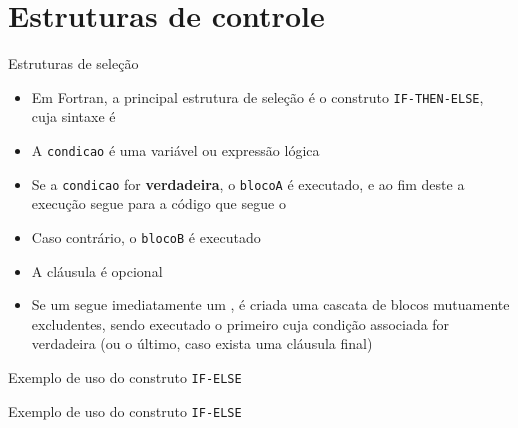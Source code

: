 \section{Estruturas de controle}

\begin{frame}[fragile]{Estruturas de seleção}

    \begin{itemize}
        \item Em Fortran, a principal estrutura de seleção é o construto \texttt{IF-THEN-ELSE},
            cuja sintaxe é


        \item A \texttt{condicao} é uma variável ou expressão lógica

        \item Se a \texttt{condicao} for \textbf{verdadeira}, o \texttt{blocoA} é executado, e ao
            fim deste a execução segue para a código que segue o 

        \item Caso contrário, o \texttt{blocoB} é executado

        \item A cláusula  é opcional

        \item Se um  segue imediatamente um , é criada
            uma cascata de blocos mutuamente excludentes, sendo executado o primeiro cuja
            condição associada for verdadeira (ou o último, caso exista uma cláusula 
             final)

    \end{itemize}

\end{frame}

\begin{frame}[fragile]{Exemplo de uso do construto {\tt IF-ELSE}}
\end{frame}

\begin{frame}[fragile]{Exemplo de uso do construto {\tt IF-ELSE}}
\end{frame}

